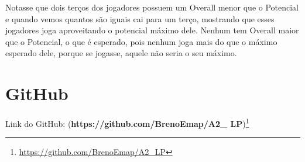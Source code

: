 \documentclass{article}
\begin{document}
Notasse que dois terços dos jogadores possuem um Overall menor que o Potencial e quando vemos quantos são iguais cai para um terço, mostrando que esses jogadores joga aproveitando o potencial máximo dele. Nenhum tem Overall maior que o Potencial,  o que é esperado, pois nenhum joga mais do que o máximo esperado dele, porque se jogasse, aquele não seria o seu máximo.

\section{GitHub}
Link do GitHub:
(\textbf{https://github.com/BrenoEmap/A2_ LP})\footnote[1]{\textcolor{blue}{\url{https://github.com/BrenoEmap/A2_LP}}}
\end{document}
